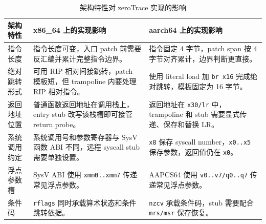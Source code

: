 \documentclass[UTF8,a4paper,11pt,fontset=fandol]{ctexart}
\newcommand{\code}[1]{\texttt{#1}}
\begin{document}
\begin{table}[H]
\centering
\caption{架构特性对 zeroTrace 实现的影响}
\label{tab:arch-design-impact}
\begin{tabularx}{\textwidth}{P{3.0cm}Y Y}
\toprule
\textbf{架构特性} & \textbf{x86\_64 上的实现影响} & \textbf{aarch64 上的实现影响}\\
\midrule
指令长度 & 指令长度可变，入口 patch 前需要反汇编并累计完整指令边界。 & 指令固定 4 字节，patch span 按 4 字节对齐累计，边界判断更直接。\\
绝对跳转形式 & 可用 RIP 相对间接跳转，patch 模板短，但 trampoline 内要处理 RIP 相对指令。 & 使用 literal load 加 \code{br x16} 完成绝对跳转，模板固定为 16 字节。\\
返回地址位置 & 普通函数返回地址在调用栈上，entry stub 改写该栈槽即可接管 return probe。 & 返回地址在 \code{x30/lr} 中，trampoline 和 stub 需要显式传递、保存和替换 LR。\\
系统调用约定 & 系统调用号和参数寄存器与 SysV 函数 ABI 不同，远程 syscall stub 需要单独设置。 & \code{x8} 保存 syscall number，\code{x0..x5} 保存参数，返回值仍在 \code{x0}。\\
浮点参数槽 & SysV ABI 使用 \code{xmm0..xmm7} 传递常见浮点参数。 & AAPCS64 使用 \code{v0..v7/q0..q7} 传递常见浮点参数。\\
条件码 & \code{rflags} 同时承载算术状态和条件跳转依据。 & \code{nzcv} 承载条件码，stub 需要配合 \code{mrs/msr} 保存恢复。\\
\bottomrule
\end{tabularx}
\end{table}
\end{document}
